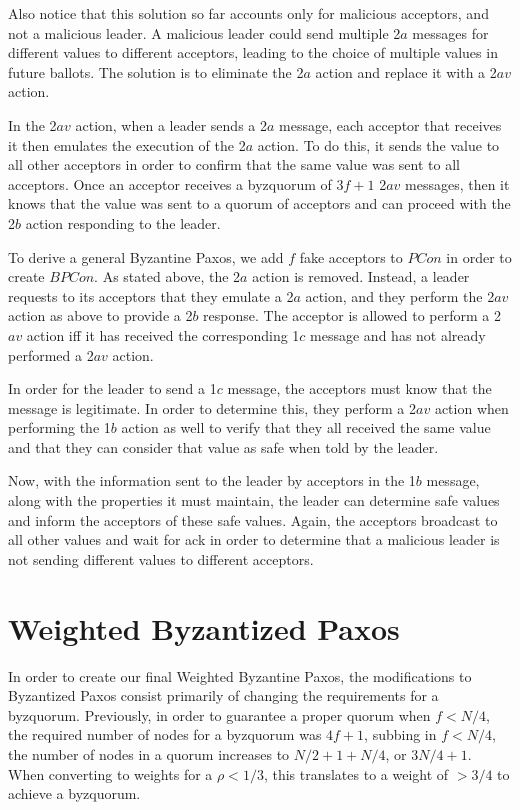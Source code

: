 \documentclass[conference]{IEEEtran}
\begin{document}
Also notice that this solution so far accounts only for malicious acceptors, and not a malicious leader. A malicious leader could send multiple 2$a$ messages for different values to different acceptors, leading to the choice of multiple values in future ballots. The solution is to eliminate the 2$a$ action and replace it with a 2$av$ action.

In the 2$av$ action, when a leader sends a 2$a$ message, each acceptor that receives it then emulates the execution of the 2$a$ action. To do this, it sends the value to all other acceptors in order to confirm that the same value was sent to all acceptors. Once an acceptor receives a byzquorum of $3f + 1$ 2$av$ messages, then it knows that the value was sent to a quorum of acceptors and can proceed with the 2$b$ action responding to the leader.
 
To derive a general Byzantine Paxos, we add $f$ fake acceptors to $PCon$ in order to create $BPCon$. As stated above, the 2$a$ action is removed. Instead, a leader requests to its acceptors that they emulate a 2$a$ action, and they perform the 2$av$ action as above to provide a 2$b$ response. The acceptor is allowed to perform a 2$av$ action iff it has received the corresponding 1$c$ message and has not already performed a 2$av$ action.

In order for the leader to send a 1$c$ message, the acceptors must know that the message is legitimate. In order to determine this, they perform a 2$av$ action when performing the 1$b$ action as well to verify that they all received the same value and that they can consider that value as safe when told by the leader.

Now, with the information sent to the leader by acceptors in the 1$b$ message, along with the properties it must maintain, the leader can determine safe values and inform the acceptors of these safe values. Again, the acceptors broadcast to all other values and wait for ack in order to determine that a malicious leader is not sending different values to different acceptors.

\section{Weighted Byzantized Paxos}
In order to create our final Weighted Byzantine Paxos, the modifications to Byzantized Paxos consist primarily of changing the requirements for a byzquorum. Previously, in order to guarantee a proper quorum when $f < N/4$, the required number of nodes for a byzquorum was $4f+ 1$, subbing in $f < N/4$, the number of nodes in a quorum increases to $N/2 + 1 + N/4$, or $3N/4 + 1$. When converting to weights for a $\rho < 1/3$, this translates to a weight of $> 3/4$ to achieve a byzquorum.
\end{document}
